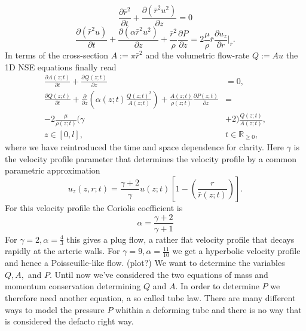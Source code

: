 \documentclass[a4paper, oneside]{discothesis}
\begin{document}
\begin{equation}
	\frac{\partial \bar{r}^2}{\partial t} + \frac{\partial (\bar{r}^2 u^2)}{\partial z} = 0
\end{equation}
\begin{equation}
	\frac{\partial (\bar{r}^2 u)}{\partial t} + \frac{\partial (\alpha \bar{r}^2 u^2) }{\partial z} + \frac{\bar{r}^2}{\rho} \frac{\partial P}{\partial z} = 2 \frac{\mu}{\rho} \bar{r} \frac{\partial u_z}{\partial r} |_{\bar{r}}.
\end{equation}
In terms of the cross-section $A := \pi \bar{r}^2$ and the volumetric flow-rate $Q := Au$ the 1D NSE equations finally read
\begin{equation}
		\begin{aligned} 
			\frac{\partial A(z;t)}{\partial t} + \frac{\partial Q(z;t)}{\partial z} &= 0, \\ 
			\frac{\partial Q(z;t)}{\partial t} + \frac{\partial}{\partial z}\left(\alpha(z;t) \frac{Q(z;t)^2}{A(z;t)} \right) + \frac{A(z;t)}{\rho(z;t)} \frac{\partial P(z;t)}{\partial z} &= \\
			-2 \frac{\mu}{\rho(z;t)} ( \gamma &+ 2 ) \frac{Q(z;t)}{A(z;t)}, \\
			z \in [0,l],\ & t \in \mathbb{R}_{\geq 0}, 
		\end{aligned} \label{eq:1Deqs1}
\end{equation}
where we have reintroduced the time and space dependence for clarity.
Here $\gamma$ is the velocity profile parameter that determines the velocity profile by a common parametric approximation 
\begin{equation}
	u_z(z,r;t) = \frac{\gamma + 2}{\gamma} u(z;t) \left[ 1 - \left( \frac{r}{\bar{r}(z;t)} \right) \right].
\end{equation}
For this velocity profile the Coriolis coefficient is
\begin{equation}
	\alpha = \frac{\gamma + 2}{\gamma + 1}
\end{equation}
For $\gamma=2, \alpha = \frac{4}{3}$ this gives a plug flow, a rather flat velocity profile that decays rapidly at the arterie walls.
For $\gamma=9, \alpha = \frac{11}{10} $ we get a hyperbolic velocity profile and hence a Poisseuille-like flow. (plot?)\cite{köppl2023dimension} \cite{barnard1966theory}
We want to determine the variables $Q, A,$ and $P$.
Until now we've considered the two equations of mass and momentum conservation determining $Q$ and $A$.
In order to determine $P$ we therefore need another equation, a so called tube law.
There are many different ways to model the pressure $P$ whithin a deforming tube and there is no way that is considered the defacto right way.
\end{document}
